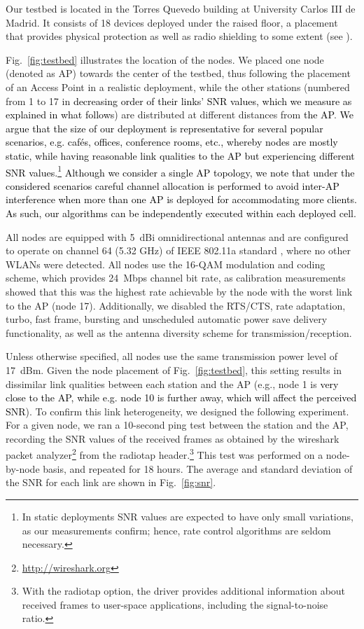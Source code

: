 \documentclass[a4paper,10pt]{article}
\newcommand{\revs}[1]{\textcolor{black}{#1}}
\begin{document}
Our testbed is located in the Torres Quevedo building at University Carlos III de Madrid. It consists of 18 devices deployed under the raised floor, a placement that provides physical protection as well as radio shielding to some extent (see \cite{serrano10eurasip}). 

Fig.~\ref{fig:testbed} illustrates the location of the nodes. We placed one node (denoted as AP) towards the center of the testbed, thus following the placement of an Access Point in a realistic deployment, while the other stations (numbered from 1 to 17 in \revs{decreasing order of their links' SNR values, which we measure as explained in what follows}) are distributed at different distances from \revs{the AP}. \revs{We argue that the size of our deployment is representative for several popular scenarios, e.g. caf\'es, offices, conference rooms, etc., whereby nodes are mostly static, while having reasonable link qualities to the AP but experiencing different SNR values.\footnote{In static deployments SNR values are expected to have only small variations, as our measurements confirm; hence, rate control algorithms are seldom necessary.} Although we consider a single AP topology, we note that under the considered scenarios careful channel allocation is performed to avoid inter-AP interference when more than one AP is deployed for accommodating more clients. As such, our algorithms can be independently executed within each deployed cell.}

All nodes are equipped with 5~dBi omnidirectional antennas and are configured to operate on channel 64 (5.32 GHz) of IEEE 802.11a standard \cite{80211A}, where no other WLANs were detected. All nodes use the 16-QAM modulation and coding scheme, which provides 24~Mbps channel bit rate, as calibration measurements showed that this was the highest rate achievable by the node with the worst link to the AP (node 17). Additionally, we disabled the RTS/CTS, rate adaptation, turbo, fast frame, bursting and unscheduled automatic power save delivery functionality, as well as the antenna diversity scheme for transmission/reception. 

Unless otherwise specified, all nodes use the same transmission power level of 17~dBm. Given the node placement of Fig.~\ref{fig:testbed}, this setting results in dissimilar link qualities between each station and the AP (e.g., node 1 is \revs{very close to the AP, while e.g. node 10 is further away, which will affect the perceived SNR}). To confirm this link heterogeneity, we designed the following experiment. For a given node, we ran a 10-second {\ttfamily ping} test between the station and the AP, recording the SNR values of the received frames as obtained by the {\ttfamily wireshark} packet analyzer\footnote{\url{http://wireshark.org}} from the {\ttfamily radiotap} header.\footnote{With the {\ttfamily radiotap} option, the driver provides additional information about received frames to user-space applications, including the signal-to-noise ratio.} This test was performed on a node-by-node basis, and repeated for 18 hours. The average and standard deviation of the SNR for each link are shown in Fig.~\ref{fig:snr}. 
\end{document}
